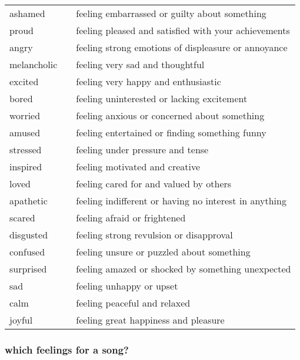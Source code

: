\documentclass[]{article} %
\begin{document}
\begin{tabular}{l p{2cm} l}
	\hline
ashamed && feeling embarrassed or guilty about something\\
proud && feeling pleased and satisfied with your achievements\\
angry && feeling strong emotions of displeasure or annoyance\\
melancholic && feeling very sad and thoughtful\\
excited && feeling very happy and enthusiastic\\
bored && feeling uninterested or lacking excitement\\
worried && feeling anxious or concerned about something\\
amused && feeling entertained or finding something funny\\
stressed && feeling under pressure and tense\\
inspired && feeling motivated and creative\\
loved && feeling cared for and valued by others\\
apathetic && feeling indifferent or having no interest in anything\\
scared && feeling afraid or frightened\\
disgusted && feeling strong revulsion or disapproval\\
confused && feeling unsure or puzzled about something\\
surprised && feeling amazed or shocked by something unexpected\\
sad && feeling unhappy or upset\\
calm && feeling peaceful and relaxed\\
joyful && feeling great happiness and pleasure\\
\end{tabular}

\iffalse
more adjectives
happy, sad, excited, joyful, melancholic, angry, frusrated, calm, peaceful, anxious, worried, stressed, content, grateful, loved, hopeful, inspired, amazed, surprised, amused, delighted, curious, intrigued, bored, indifferent, apathetic, overwhelmed, confused, scared, frightened, terrified, disgusted, revolted, ashamed, guilty, embarrassed, jealous, envious, proud, confident, determined, optimistic, pessimistic
\fi


\subsubsection*{which feelings for a song?}
\end{document}
